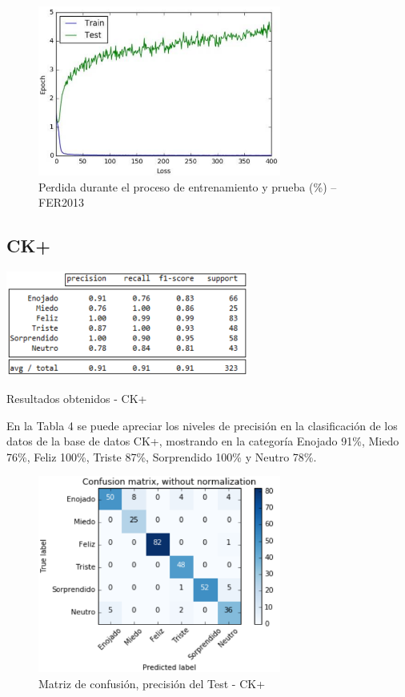 \begin{figure}[H]
		\centering
		\includegraphics[width=80mm]{./Imagenes/perdida_fer.png}
		\caption{Perdida durante el proceso de entrenamiento y prueba (\%) – FER2013}
		\label{fig:perdida_fer}
\end{figure}

\subsection{CK+}

\begin{table}[H]
    \centering
    \includegraphics[width=80mm]{./Imagenes/tabla_resultados_ck+.png} 
    \caption{Resultados obtenidos - CK+}
    \label{tab:tabla_resultados_ck+}
\end{table}

En la Tabla 4 se puede apreciar los niveles de precisión en la clasificación de los
datos de la base de datos CK+, mostrando en la categoría Enojado 91\%, Miedo 76\%,
Feliz 100\%, Triste 87\%, Sorprendido 100\% y Neutro 78\%.

\begin{figure}[H]
		\centering
		\includegraphics[width=80mm]{./Imagenes/matriz_confusion_ck+.png}
		\caption{Matriz de confusión, precisión del Test - CK+}
		\label{fig:matriz_confusion_ck+}
\end{figure}


